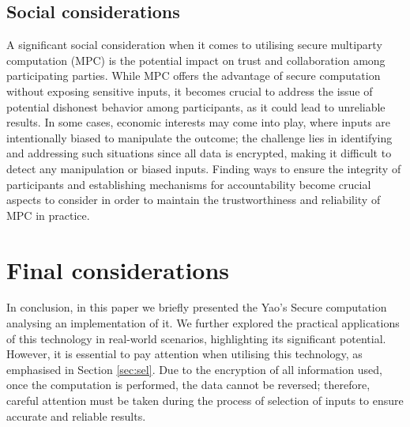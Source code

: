 \documentclass[12pt]{article}
\begin{document}
\subsection{Social considerations}
A significant social consideration when it comes to utilising secure multiparty computation (MPC) is the potential impact on trust and collaboration among participating parties. While MPC offers the advantage of secure computation without exposing sensitive inputs, it becomes crucial to address the issue of potential dishonest behavior among participants, as it could lead to unreliable results. In some cases, economic interests may come into play, where inputs are intentionally biased to manipulate the outcome; the challenge lies in identifying and addressing such situations since all data is encrypted, making it difficult to detect any manipulation or biased inputs. Finding ways to ensure the integrity of participants and establishing mechanisms for accountability become crucial aspects to consider in order to maintain the trustworthiness and reliability of MPC in practice. 
\section{Final considerations}\label{sec:end}
In conclusion, in this paper we briefly presented the Yao's Secure computation analysing an implementation of it. We further explored the practical applications of this technology in real-world scenarios, highlighting its significant potential. However, it is essential to pay attention when utilising this technology, as emphasised in Section \ref{sec:sel}. Due to the encryption of all information used, once the computation is performed, the data cannot be reversed; therefore, careful attention must be taken during the process of selection of inputs to ensure accurate and reliable results.

\end{document}
